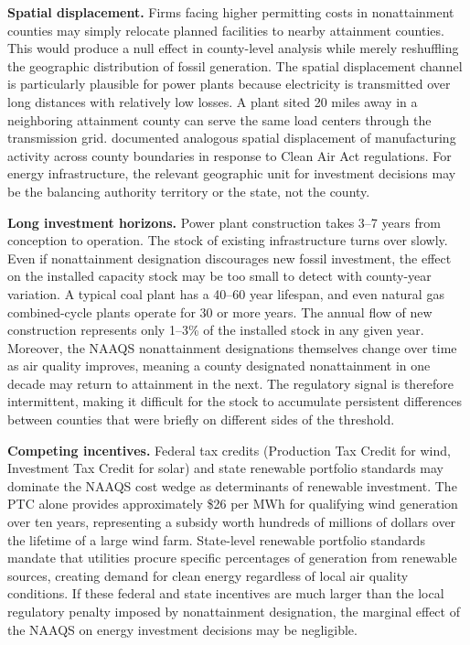 \documentclass[12pt]{article}
\begin{document}
\textbf{Spatial displacement.} Firms facing higher permitting costs in nonattainment counties may simply relocate planned facilities to nearby attainment counties. This would produce a null effect in county-level analysis while merely reshuffling the geographic distribution of fossil generation. The spatial displacement channel is particularly plausible for power plants because electricity is transmitted over long distances with relatively low losses. A plant sited 20 miles away in a neighboring attainment county can serve the same load centers through the transmission grid. \citet{becker2000effects} documented analogous spatial displacement of manufacturing activity across county boundaries in response to Clean Air Act regulations. For energy infrastructure, the relevant geographic unit for investment decisions may be the balancing authority territory or the state, not the county.

\textbf{Long investment horizons.} Power plant construction takes 3--7 years from conception to operation. The stock of existing infrastructure turns over slowly. Even if nonattainment designation discourages new fossil investment, the effect on the installed capacity stock may be too small to detect with county-year variation. A typical coal plant has a 40--60 year lifespan, and even natural gas combined-cycle plants operate for 30 or more years. The annual flow of new construction represents only 1--3\% of the installed stock in any given year. Moreover, the NAAQS nonattainment designations themselves change over time as air quality improves, meaning a county designated nonattainment in one decade may return to attainment in the next. The regulatory signal is therefore intermittent, making it difficult for the stock to accumulate persistent differences between counties that were briefly on different sides of the threshold.

\textbf{Competing incentives.} Federal tax credits (Production Tax Credit for wind, Investment Tax Credit for solar) and state renewable portfolio standards may dominate the NAAQS cost wedge as determinants of renewable investment. The PTC alone provides approximately \$26 per MWh for qualifying wind generation over ten years, representing a subsidy worth hundreds of millions of dollars over the lifetime of a large wind farm. State-level renewable portfolio standards mandate that utilities procure specific percentages of generation from renewable sources, creating demand for clean energy regardless of local air quality conditions. If these federal and state incentives are much larger than the local regulatory penalty imposed by nonattainment designation, the marginal effect of the NAAQS on energy investment decisions may be negligible.
\end{document}

